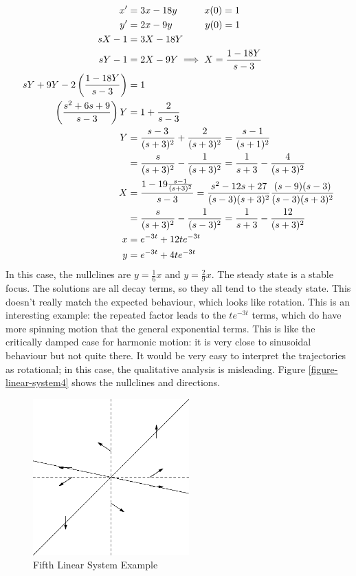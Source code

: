 \documentclass[fleqn,letterpaper]{report}
\begin{document}
\begin{example}
\begin{align*}
x^\prime & = 3x - 18y \hspace{1cm} x(0) = 1\\
y^\prime & = 2x - 9y \hspace{1.2cm} y(0) = 1\\
sX - 1 & = 3X - 18Y \\
sY - 1 & = 2X - 9Y \implies X = \frac{1-18Y}{s-3} \\
sY + 9Y - 2 \left( \frac{1-18Y}{s-3} \right) & = 1 \\
\left( \frac{s^2+6s+9}{s-3} \right) Y & = 1 + \frac{2}{s-3} \\
Y & = \frac{s-3}{(s+3)^2} + \frac{2}{(s+3)^2} =
\frac{s-1}{(s+1)^2} \\
& = \frac{s}{(s+3)^2} - \frac{1}{(s+3)^2} 
= \frac{1}{s+3} - \frac{4}{(s+3)^2} \\
X & = \frac{1 - 19 \frac{s-1}{(s+3)^2}}{s-3} = 
\frac{s^2-12s+27}{(s-3)(s+3)^2}
\frac{(s-9)(s-3)}{(s-3)(s+3)^2} \\
& = \frac{s}{(s+3)^2} - \frac{1}{(s-3)^2} = \frac{1}{s+3} -
\frac{12}{(s+3)^2} \\
x & = e^{-3t} + 12 t e^{-3t} \\
y & = e^{-3t} + 4 t e^{-3t}
\end{align*}
In this case, the nullclines are $y = \frac{1}{6}x$ and $y =
\frac{2}{9}x$. The steady state is a stable focus. The
solutions are all decay terms, so they all tend to the steady
state. This doesn't really match the expected behaviour,
which looks like rotation. This is an interesting example:
the repeated factor leads to the $t e^{-3t}$ terms, which do
have more spinning motion that the general exponential terms.
This is like the critically damped case for harmonic motion:
it is very close to sinusoidal behaviour but not quite there.
It would be very easy to interpret the trajectories as
rotational; in this case, the qualitative analysis is
misleading. Figure \ref{figure-linear-system4} shows
the nullclines and directions.
\end{example}

\begin{figure}[t]
\centering
\includegraphics[width=6cm]{figure38.eps}
\caption{Fifth Linear System Example}
\label{figure-linear-system5}
\end{figure}
\end{document}
